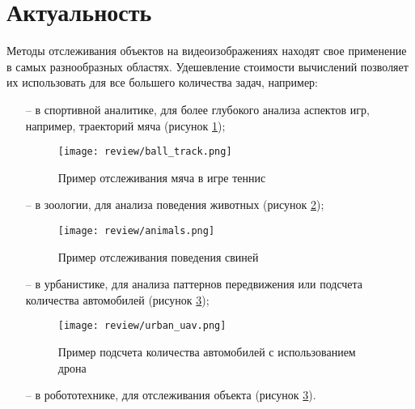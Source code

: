 \section{Актуальность}
Методы отслеживания объектов на видеоизображениях находят свое применение в самых разнообразных областях. 
Удешевление стоимости вычислений позволяет их использовать для все большего количества задач, например:
\begin{itemize}
    \item[--] в спортивной аналитике, для более глубокого анализа аспектов игр, например, траекторий мяча (рисунок \ref{fig:ball_track});
    \begin{figure}[ht]
        \centering
        \texttt{[image: review/ball\_track.png]}
        \caption{Пример отслеживания мяча в игре теннис \cite[страница 30, рисунок 16]{naik2022comprehensive}}
        \label{fig:ball_track}
    \end{figure}
    \FloatBarrier
    \item[--] в зоологии, для анализа поведения животных (рисунок \ref{fig:animals}); 
    \begin{figure}[ht]
        \centering
        \texttt{[image: review/animals.png]}
        \caption{Пример отслеживания поведения свиней \cite[страница 12, рисунок 7]{tu2024behavior}}
        \label{fig:animals}
    \end{figure}
    \FloatBarrier
    \item[--] в урбанистике, для анализа паттернов передвижения или подсчета количества автомобилей (рисунок \ref{fig:urban});
    \begin{figure}[ht]
        \centering
        \texttt{[image: review/urban\_uav.png]}
        \caption{Пример подсчета количества автомобилей с использованием дрона \cite[страница 16, рисунок 8]{wu2024multi}}
        \label{fig:urban}
    \end{figure}
    \FloatBarrier
    \item[--] в робототехнике, для отслеживания объекта (рисунок \ref{fig:urban}). 

\end{itemize}

